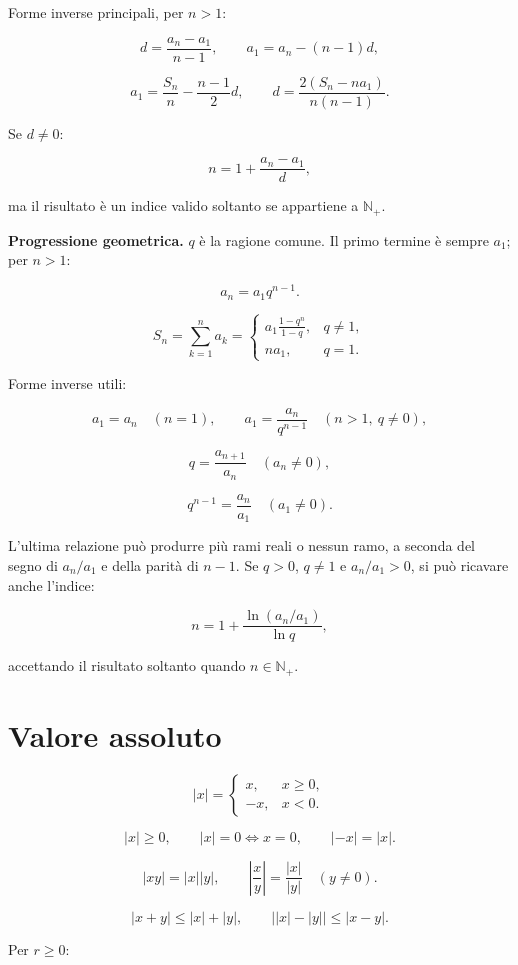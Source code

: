 Forme inverse principali, per \(n>1\):

\[
d=\frac{a_n-a_1}{n-1},
\qquad
a_1=a_n-(n-1)d,
\]

\[
a_1=\frac{S_n}{n}-\frac{n-1}{2}d,
\qquad
d=\frac{2(S_n-na_1)}{n(n-1)}.
\]

Se \(d\ne0\):

\[
n=1+\frac{a_n-a_1}{d},
\]

ma il risultato è un indice valido soltanto se appartiene a \(\mathbb N_+\).

\textbf{Progressione geometrica.} \(q\) è la ragione comune. Il primo termine è sempre \(a_1\); per \(n>1\):

\[
a_n=a_1q^{n-1}.
\]

\[
S_n=\sum_{k=1}^{n}a_k
=
\begin{cases}
\displaystyle a_1\frac{1-q^n}{1-q},&q\ne1,\\[8pt]
na_1,&q=1.
\end{cases}
\]

Forme inverse utili:

\[
a_1=a_n\quad(n=1),
\qquad
a_1=\frac{a_n}{q^{n-1}}\quad(n>1,\ q\ne0),
\]

\[
q=\frac{a_{n+1}}{a_n}\quad(a_n\ne0),
\]

\[
q^{n-1}=\frac{a_n}{a_1}\quad(a_1\ne0).
\]

L'ultima relazione può produrre più rami reali o nessun ramo, a seconda del segno di \(a_n/a_1\) e della parità di \(n-1\). Se \(q>0\), \(q\ne1\) e \(a_n/a_1>0\), si può ricavare anche l'indice:

\[
n=1+\frac{\ln(a_n/a_1)}{\ln q},
\]

accettando il risultato soltanto quando \(n\in\mathbb N_+\).

\section{Valore assoluto}\label{valore-assoluto}

\[
|x|=
\begin{cases}
x,&x\ge0,\\
-x,&x<0.
\end{cases}
\]

\[
|x|\ge0,
\qquad
|x|=0\Longleftrightarrow x=0,
\qquad
|-x|=|x|.
\]

\[
|xy|=|x||y|,
\qquad
\left|\frac xy\right|=\frac{|x|}{|y|}\quad(y\ne0).
\]

\[
|x+y|\le|x|+|y|,
\qquad
\bigl||x|-|y|\bigr|\le|x-y|.
\]

Per \(r\ge0\):

